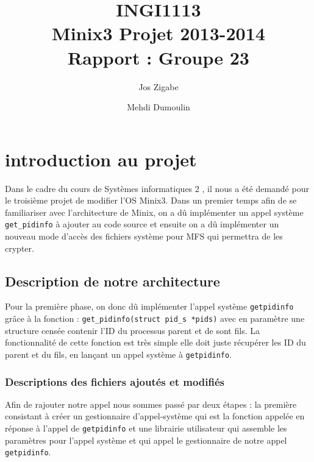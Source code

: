 \documentclass[10pt, onecolumn] {IEEEtran}
\title{INGI1113\\
Minix3 Projet 2013-2014\\
Rapport : Groupe 23}
\author{Jos Zigabe  \and Mehdi Dumoulin}
\begin{document}
\maketitle
\tableofcontents
\newpage

\section{introduction au projet}

Dans le cadre du cours de \og Systèmes informatiques 2 \fg, il nous a été demandé pour le troisième projet de modifier l'OS Minix3. Dans un premier temps afin de se familiariser avec l'architecture de Minix, on a dû implémenter un appel système \texttt{get\_pidinfo} à ajouter au code source et ensuite on a dû implémenter un nouveau mode d'accès des fichiers système pour MFS qui permettra de les crypter.      

\subsection{Description de notre architecture}

Pour la première phase, on donc dû implémenter l'appel système \texttt{getpidinfo} grâce à la fonction : \texttt{get\_pidinfo(struct pid\_s *pids)} avec en paramètre une structure censée contenir l'ID du processus parent et de sont fils. La fonctionnalité de cette fonction est très simple elle doit juste récupérer les ID du parent et du fils, en lançant un appel système à  \texttt{getpidinfo}.\\

\subsubsection{Descriptions des fichiers ajoutés et modifiés }

Afin de rajouter notre appel nous sommes passé par deux étapes : la première consistant à créer un gestionnaire d'appel-système qui est la fonction appelée en réponse à l'appel de \texttt{getpidinfo} et une librairie utilisateur qui assemble les paramètres pour l'appel système et qui appel le gestionnaire de notre appel  \texttt{getpidinfo}.\\
\end{document}
